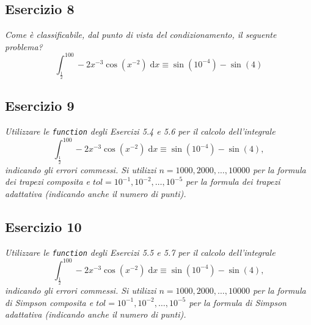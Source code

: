 \subsection{Esercizio 8}
\label{sub:es8}
\emph{Come è classificabile, dal punto di vista del condizionamento, il seguente problema?
			$$\int_{\frac{1}{2}}^{100}-2x^{-3}\cos\left(x^{-2}\right)\;\mathrm{d}x\equiv\sin\left(10^{-4}\right)-\sin(4)$$}

\subsection{Esercizio 9}
\label{sub:es9}
\emph{Utilizzare le \lstinline{function} degli Esercizi 5.4 e 5.6 per il calcolo dell'integrale
      $$\int_{\frac{1}{2}}^{100}-2x^{-3}\cos\left(x^{-2}\right)\;\mathrm{d}x\equiv\sin\left(10^{-4}\right)-\sin(4),$$
			indicando gli errori commessi.
      Si utilizzi $n=1000,2000,\dots,10000$ per la formula dei trapezi composita e
      $tol=10^{-1},10^{-2},\dots,10^{-5}$ per la formula dei trapezi adattativa (indicando anche il numero di punti).}

\subsection{Esercizio 10}
\label{sub:es10}
\emph{Utilizzare le \lstinline{function} degli Esercizi 5.5 e 5.7 per il calcolo dell'integrale
      $$\int_{\frac{1}{2}}^{100}-2x^{-3}\cos\left(x^{-2}\right)\;\mathrm{d}x\equiv\sin\left(10^{-4}\right)-\sin(4),$$
			indicando gli errori commessi.
      Si utilizzi $n=1000,2000,\dots,10000$ per la formula di Simpson composita e
      $tol=10^{-1},10^{-2},\dots,10^{-5}$ per la formula di Simpson adattativa (indicando anche il numero di punti).}
